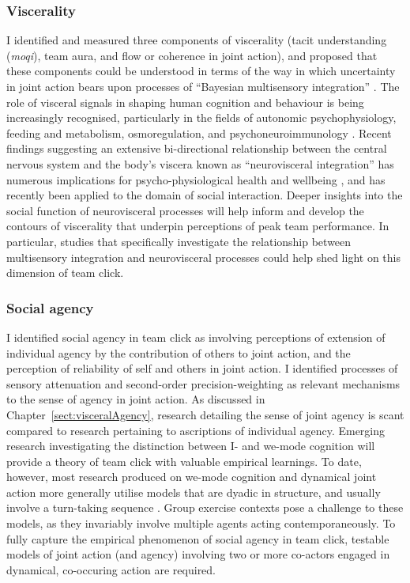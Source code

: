 \subsubsection{Viscerality}
I identified and measured three components of viscerality (tacit understanding (\textit{moqi}), team aura, and flow or coherence in joint action), and proposed that these components could be understood in terms of the way in which uncertainty in joint action bears upon processes of ``Bayesian multisensory integration'' \citep{Ernst2004}.
The role of visceral signals in shaping human cognition and behaviour is being increasingly recognised, particularly in the fields of autonomic psychophysiology, feeding and metabolism, osmoregulation, and psychoneuroimmunology \citep[see:][]{Critchley2013}.  Recent findings suggesting an extensive bi-directional relationship between the central nervous system and the body's viscera known as ``neurovisceral integration'' \citep[the gut-brain axis; see][]{Carabotti2015} has numerous implications for psycho-physiological health and wellbeing \citep{Porges2009}, and has recently been applied to the domain of social interaction\citep[see:][]{Porges2001,VanKleef2008,Akinola2014}.  Deeper insights into the social function of neurovisceral processes will help inform and develop the contours of viscerality that underpin perceptions of peak team performance.  In particular, studies that specifically investigate the relationship between multisensory integration and neurovisceral processes could help shed light on this dimension of team click.

\subsubsection{Social agency}
I identified social agency in team click as involving perceptions of extension of individual agency by the contribution of others to joint action, and the perception of reliability of self and others in joint action.  I identified  processes of sensory attenuation and second-order precision-weighting as relevant mechanisms to the sense of agency in joint action.  As discussed in Chapter~\ref{sect:visceralAgency}, research detailing the sense of joint agency is scant compared to research pertaining to ascriptions of individual agency.  Emerging research investigating the distinction between I- and we-mode cognition \citep{Gallotti2013,VanderWel2015,Noy2017} will provide a theory of team click with valuable empirical learnings.  To date, however, most research produced on we-mode cognition and dynamical joint action more generally utilise models that are dyadic in structure, and usually involve a turn-taking sequence \citep{Friston2015,Pesquita2017}.  Group exercise contexts pose a challenge to these models, as they invariably involve multiple agents acting contemporaneously. To fully capture the empirical phenomenon of social agency in team click, testable models of joint action (and agency) involving two or more co-actors engaged in dynamical, co-occuring action are required.

